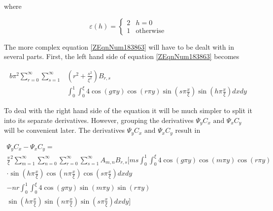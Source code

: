 \documentclass{article}
\newcommand{\spbox}[1]{ \text{ #1 }} %
\begin{document}
where

\begin{equation} \label{3.23)} 
    \varepsilon \left(h\right) = \begin{cases}
        2 & h = 0 \\ 
        1 & \text{otherwise}\end{cases} 
\end{equation} 

The more complex equation \eqref{ZEqnNum183863} will have to be dealt with in
several parts. First, the left hand side of equation \eqref{ZEqnNum183863}
becomes

\begin{equation} \label{ZEqnNum189325} \begin{split} 
    b\pi ^{2} \sum _{r=0}^{\infty } \sum_{s=1}^{\infty } 
    & \left(r^{2} + \frac{s^{2} }{\xi^{2} } \right) B_{r,s} \\ 
    & \int_{0}^{1} \int_{0}^{\xi } 4 \cos \left(g \pi y\right) 
    \cos \left(r\pi y\right) \sin\left(s \pi \frac{x}{\xi} \right)
    \sin \left(h \pi \frac{x}{\xi} \right) dxdy
\end{split} \end{equation}

 To deal with the right hand side of the equation it will be much simpler to
 split it into its separate derivatives. However, grouping the derivatives $\Psi
 _{y} C_{x} \spbox{and} \Psi _{x} C_{y} $ will be convenient later. The derivatives
 $\Psi _{y} C_{x} \spbox{and} \Psi _{x} C_{y} $ result in

\begin{equation} \label{ZEqnNum757716} \begin{array}{l} {\Psi _{y} C_{x} -\Psi
_{x} C_{y} =} \\ {\frac{\pi }{\xi } ^{2} \sum _{m=1}^{\infty } \sum
_{n=0}^{\infty } \sum _{r=0}^{\infty } \sum _{s=1}^{\infty }A_{m,n} B_{r,s}
[ms\int _{0}^{1} \int _{0}^{\xi }4\cos \left(g\pi y\right)\cos \left(m\pi
y\right)\cos \left(r\pi y\right) } \\ {\cdot \sin \left(h\pi \frac{x}{\xi}
\right)\cos \left(n\pi \frac{x}{\xi } \right)\cos \left(s\pi \frac{x}{\xi }
\right)dxdy} \\ {-nr\int _{0}^{1} \int _{0}^{\xi }4\cos \left(g\pi y\right)\sin
\left(m\pi y\right)\sin \left(r\pi y\right)} \\ {\sin \left(h\pi \frac{x}{\xi }
\right)\sin \left(n\pi \frac{x}{\xi } \right)\sin \left(s\pi \frac{x}{\xi }
\right)dxdy]} \end{array} \end{equation}
\end{document}
